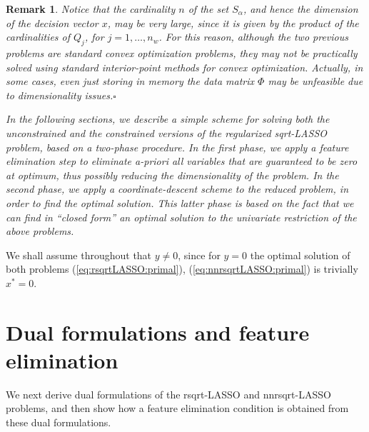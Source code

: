 \documentclass[11pt]{article}
\newcommand{\qed}{{\hfill $\square$}}
\newtheorem{remark}{Remark}
\begin{document}
\begin{remark}\rm Notice that the cardinality $n$ of the set $S_{\alpha}$, and hence the dimension of the decision vector $x$, may be
very large, since it is given by the product of the cardinalities of $Q_{j}$, for $j=1,\ldots,n_w$.
For this reason, although the two previous problems are standard convex optimization problems, they may
not be practically solved using standard interior-point methods for convex optimization. Actually, in some cases, even just storing in memory the data matrix $\Phi$ may be unfeasible due to dimensionality issues.\qed

In the following sections, we describe a simple scheme for solving both the unconstrained and the constrained versions
of the regularized sqrt-LASSO problem, based on a two-phase procedure. 
In the first phase, we apply a feature elimination step to eliminate a-priori all variables that are guaranteed to be zero at optimum, thus possibly reducing the dimensionality of the problem. In the second phase, we apply a coordinate-descent scheme to the reduced problem, in order to find the optimal solution. This latter phase is based on the fact that we can find in ``closed form'' an optimal solution to the univariate restriction of the above problems. 
\end{remark}

\vspace{.2cm}
We shall assume throughout that $y\neq 0$, since for $y=0$ the optimal solution of both problems 
(\ref{eq:rsqrtLASSO:primal}), (\ref{eq:nnrsqrtLASSO:primal})   is trivially $x^*=0$.

\section{Dual  formulations and feature elimination}
\label{sec:dual}

We next derive dual formulations of the rsqrt-LASSO and nnrsqrt-LASSO problems,
and then show how a feature elimination condition is obtained from these dual formulations. 
\end{document}
